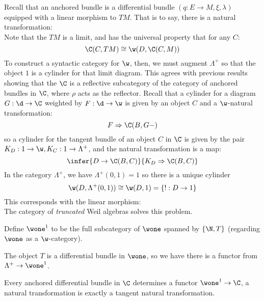 Recall that an anchored bundle is a differential bundle $(q:E \to M, \xi, \lambda)$ equipped with a linear morphism to $TM$.
That is to say, there is a natural transformation:
\[
    
    
\]
Note that the $TM$ is a limit, and has the universal property that for any $C$:
\[
    \C(C, TM) \cong \w(D, \C(C,M))    
\]
To construct a syntactic category for $\w$, then, we must augment $\Lambda^+$ so that the object $1$ is a cylinder for that limit diagram.
This agrees with previous results showing that the $\C$ is a reflective subcategory of the category of anchored bundles in $\C$, where $\rho$ acts as the reflector.
Recall that a cylinder for a diagram $G: \d \to \C$ weighted by $F:\d \to \w$ is given by an object $C$ and a $\w$-natural transformation:
\[
	F \Rightarrow \C(B, G-)
\]
so a cylinder for the tangent bundle of an object $C$ in $\C$ is given by the pair $K_D:1 \to \w, K_C: 1 \to \Lambda^+$, and the natural transformation is a map:
\[
	\infer{D \to \C(B,C) }{K_D \Rightarrow \C(B, C)}
\]
In the category $\Lambda^+$, we have $\Lambda^+(0,1) = 1$ so there is a unique cylinder
\[
	\w(D, \Lambda^+(0,1)) \cong \w(D, 1) = \{ !:D \to 1\}
\]
This corresponds with the linear morphism:
\[\]
The category of \emph{truncated} Weil algebras solves this problem. 
\begin{definition}
    Define $\wone^1$ to be the full subcategory of $\wone$ spanned by $\{ \N, T \}$ (regarding $\wone$ as a $\w$-category).
\end{definition}
The object $T$ is a differential bundle in $\wone$, so we have there is a functor from $\Lambda^+ \to \wone^1$.
\begin{proposition}
    Every anchored differential bundle in $\C$ determines a functor $\wone^1 \to \C$, a natural transformation is exactly a tangent natural transformation.
\end{proposition}
